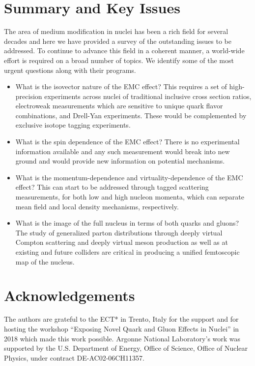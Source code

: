 \section{Summary and Key Issues}

The area of medium modification in nuclei has been a rich field for several decades and here we have provided a survey of the outstanding issues to be addressed.  To continue to advance this field in a coherent manner, a world-wide effort is required on a broad number of topics.  We identify some of the most urgent questions along with their programs.

\begin{itemize}
    \item{What is the isovector nature of the EMC effect?  This requires a set of high-precision experiments across nuclei of traditional inclusive cross section ratios, electroweak measurements which are sensitive to unique quark flavor combinations, and Drell-Yan experiments.  These would be complemented by exclusive isotope tagging experiments.}
    \item{What is the spin dependence of the EMC effect?  There is no experimental information available and any such measurement would break into new ground and would provide new information on potential mechanisms.}
    \item{What is the momentum-dependence and virtuality-dependence of the EMC effect?  This can start to be addressed through tagged scattering measurements, for both low and high nucleon momenta, which can separate mean field and local density mechanisms, respectively.}
    \item{What is the image of the full nucleus in terms of both quarks and gluons?  The study of generalized parton distributions through deeply virtual Compton scattering and deeply virtual meson production as well as at existing and future colliders are critical in producing a unified femtoscopic map of the nucleus.}
\end{itemize}

\section{Acknowledgements}

The authors are grateful to the ECT* in Trento, Italy for the support and for hosting the workshop ``Exposing Novel Quark and Gluon Effects in Nuclei'' in 2018 which made this work possible.  Argonne National Laboratory's work was supported by the U.S. Department of Energy, Office of Science, Office of Nuclear Physics, under contract DE-AC02-06CH11357.  
